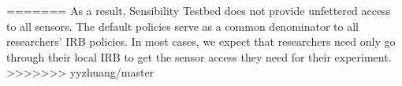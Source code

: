=======
As a result, Sensibility Testbed does not
provide unfettered access to all sensors. 
The default policies serve as a common denominator to all 
researchers' IRB policies. In most cases, we expect
that researchers need only go through their local IRB to get
the sensor access they need for their experiment. 
>>>>>>> yyzhuang/master
